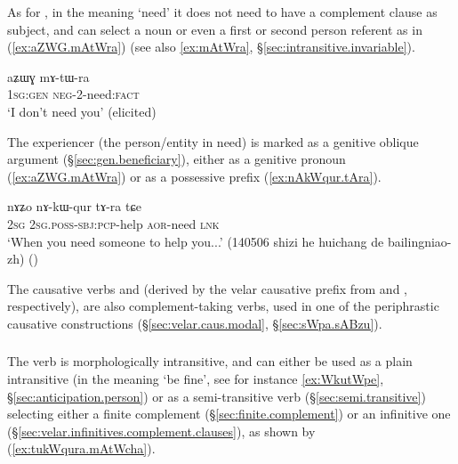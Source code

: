 As for , in the meaning `need' it does not need to have a complement clause as subject, and can select a noun or even a first or second person referent as in (\ref{ex:aZWG.mAtWra}) (see also \ref{ex:mAtWra}, §\ref{sec:intransitive.invariable}).  

\begin{exe} 
\ex \label{ex:aZWG.mAtWra}
\gll  aʑɯɣ mɤ-tɯ-ra \\
 \textsc{1sg}:\textsc{gen} \textsc{neg}-2-need:\textsc{fact} \\
 \glt `I don't need you' (elicited)
\end{exe} 

The experiencer (the person/entity in need) is marked as a genitive oblique argument (§\ref{sec:gen.beneficiary}), either as a genitive pronoun (\ref{ex:aZWG.mAtWra}) or as a possessive prefix (\ref{ex:nAkWqur.tAra}).
 
\begin{exe} 
\ex \label{ex:nAkWqur.tAra}
\gll nɤʑo nɤ-kɯ-qur tɤ-ra tɕe \\
\textsc{2sg} \textsc{2sg}.\textsc{poss}-\textsc{sbj}:\textsc{pcp}-help \textsc{aor}-need \textsc{lnk} \\
\glt `When you need someone to help you...' (140506 shizi he huichang de bailingniao-zh)
()
\end{exe}  


The causative verbs  and   (derived by the velar causative prefix from  and , respectively), are also complement-taking verbs, used in one of the periphrastic causative constructions (§\ref{sec:velar.caus.modal}, §\ref{sec:sWpa.sABzu}).

 \subsubsection{} \label{sec:cha.verb}
The verb  is morphologically intransitive, and can either be used as a plain intransitive (in the meaning `be fine', see for instance \ref{ex:WkutWpe}, §\ref{sec:anticipation.person}) or as a semi-transitive verb (§\ref{sec:semi.transitive}) selecting either a finite complement (§\ref{sec:finite.complement}) or an infinitive one (§\ref{sec:velar.infinitives.complement.clauses}), as shown by (\ref{ex:tukWqura.mAtWcha}).

